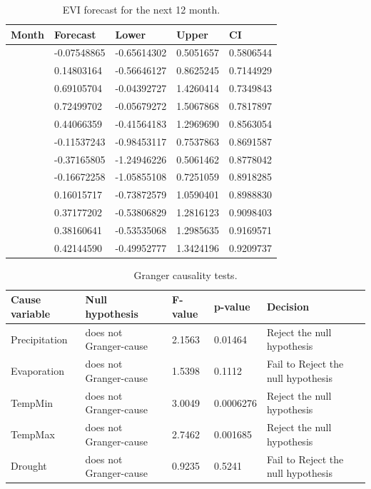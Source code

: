 \begin{table}[]
	\label{table:Prediction}
	\caption{EVI forecast for the next 12 month.}
	\centering
	\addtolength{\tabcolsep}{25pt}
	\begin{tabularx}{\textwidth}{@{}lllll@{}}
		\toprule
   Month       & Forecast& Lower  &   Upper  &CI\\
   \bottomrule
 &-0.07548865& -0.65614302& 0.5051657& 0.5806544\\
 & 0.14803164& -0.56646127& 0.8625245& 0.7144929\\
 & 0.69105704& -0.04392727& 1.4260414& 0.7349843\\
 & 0.72499702& -0.05679272& 1.5067868& 0.7817897\\
 & 0.44066359& -0.41564183& 1.2969690& 0.8563054\\
 &-0.11537243& -0.98453117& 0.7537863& 0.8691587\\
 &-0.37165805& -1.24946226& 0.5061462& 0.8778042\\
 &-0.16672258& -1.05855108& 0.7251059& 0.8918285\\
 & 0.16015717& -0.73872579& 1.0590401& 0.8988830\\
 &  0.37177202& -0.53806829& 1.2816123& 0.9098403\\
 &  0.38160641& -0.53535068& 1.2985635& 0.9169571\\
 &  0.42144590& -0.49952777& 1.3424196& 0.9209737\\
		 \bottomrule
\end{tabularx}
\end{table}
\begin{table}[]
	\label{Optimal lag}
	\caption{Granger causality tests.}
	\centering
	\addtolength{\tabcolsep}{5pt}
	\begin{tabularx}{\textwidth}{@{}lllll@{}}
	\hline
	Cause variable &Null hypothesis& F-value& p-value& Decision\\
	\hline\hline
Precipitation	& does not Granger-cause &2.1563  & 0.01464  & Reject the null hypothesis  \\
	\hline
Evaporation	& does not Granger-cause & 1.5398 & 0.1112 &Fail to Reject the null hypothesis  \\
	\hline
TempMin	&  does not Granger-cause&3.0049  & 0.0006276 &Reject the null hypothesis  \\
	\hline
TempMax	& does not Granger-cause &2.7462  & 0.001685 &Reject the null hypothesis  \\
	\hline
Drought	& does not Granger-cause & 0.9235 & 0.5241 &Fail to Reject the null hypothesis \\
	\hline
\end{tabularx}
\end{table}
